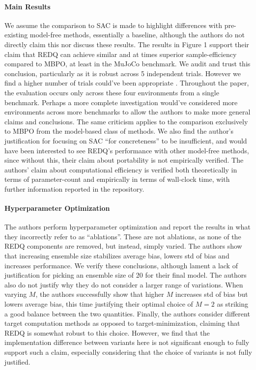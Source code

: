 \documentclass{article}
\begin{document}
\paragraph{Main Results} We assume the comparison to SAC is made to highlight differences with pre-existing model-free methods, essentially a baseline, although the authors do not directly claim this nor discuss these results. The results in Figure 1 support their claim that REDQ can achieve similar and at times superior sample-efficiency compared to MBPO, at least in the MuJoCo benchmark. We audit and trust this conclusion, particularly as it is robust across 5 independent trials. However we find a higher number of trials could've been appropriate \citep{henderson_deep_2018}. Throughout the paper, the evaluation occurs only across these four environments from a single benchmark. Perhaps a more complete investigation would've considered more environments across more benchmarks to allow the authors to make more general claims and conclusions. The same criticism applies to the comparison exclusively to MBPO from the model-based class of methods. We also find the author's justification for focusing on SAC ``for concreteness'' to be insufficient, and would have been interested to see REDQ's performance with other model-free methods, since without this, their claim about portability is not empirically verified. The authors' claim about computational efficiency is verified both theoretically in terms of parameter-count and empirically in terms of wall-clock time, with further information reported in the repository.
\paragraph{Hyperparameter Optimization} The authors perform hyperparameter optimization and report the results in what they incorrectly refer to as ``ablations''. These are not ablations, as none of the REDQ components are removed, but instead, simply varied. The authors show that increasing ensemble size stabilizes average bias, lowers std of bias and increases performance. We verify these conclusions, although lament a lack of justification for picking an ensemble size of 20 for their final model. The authors also do not justify why they do not consider a larger range of variations. When varying $M$, the authors successfully show that higher $M$ increases std of bias but lowers average bias, this time justifying their optimal choice of $M=2$ as striking a good balance between the two quantities. Finally, the authors consider different target computation methods as opposed to target-minimization, claiming that REDQ is somewhat robust to this choice. However, we find that the implementation difference between variants here is not significant enough to fully support such a claim, especially considering that the choice of variants is not fully justified.
\end{document}
